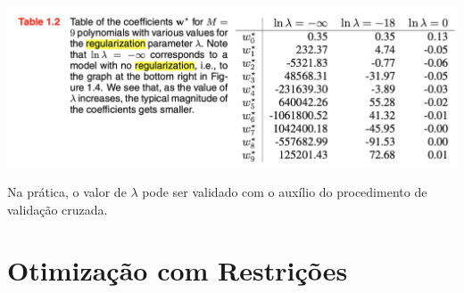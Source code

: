 \documentclass{beamer}
\begin{document}
\begin{frame}
\centering
\includegraphics[width=\textwidth,height=0.8\textheight,keepaspectratio]{imgs/bishop_example/5.png}


\footnotesize{
Na prática, o valor de $\lambda$ pode ser validado com o auxílio do procedimento de validação cruzada.}
\end{frame}

\section{Otimização com Restrições}
\end{document}
